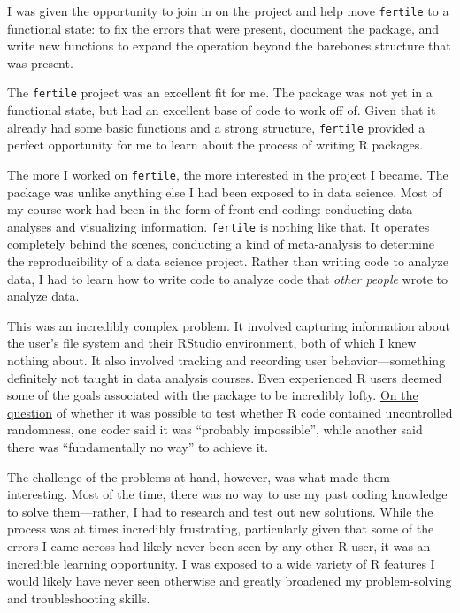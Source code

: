 \documentclass[12pt,twoside]{reedthesis}
\begin{document}
I was given the opportunity to join in on the project and help move \texttt{fertile} to a functional state: to fix the errors that were present, document the package, and write new functions to expand the operation beyond the barebones structure that was present.

The \texttt{fertile} project was an excellent fit for me. The package was not yet in a functional state, but had an excellent base of code to work off of. Given that it already had some basic functions and a strong structure, \texttt{fertile} provided a perfect opportunity for me to learn about the process of writing R packages.

The more I worked on \texttt{fertile}, the more interested in the project I became. The package was unlike anything else I had been exposed to in data science. Most of my course work had been in the form of front-end coding: conducting data analyses and visualizing information. \texttt{fertile} is nothing like that. It operates completely behind the scenes, conducting a kind of meta-analysis to determine the reproducibility of a data science project. Rather than writing code to analyze data, I had to learn how to write code to analyze code that \emph{other people} wrote to analyze data.

This was an incredibly complex problem. It involved capturing information about the user's file system and their RStudio environment, both of which I knew nothing about. It also involved tracking and recording user behavior---something definitely not taught in data analysis courses. Even experienced R users deemed some of the goals associated with the package to be incredibly lofty. \href{https://stackoverflow.com/questions/43638773/comprehensive-way-to-check-for-functions-that-use-the-random-number-generator-in}{On the question} of whether it was possible to test whether R code contained uncontrolled randomness, one coder said it was ``probably impossible'', while another said there was ``fundamentally no way'' to achieve it.

The challenge of the problems at hand, however, was what made them interesting. Most of the time, there was no way to use my past coding knowledge to solve them---rather, I had to research and test out new solutions. While the process was at times incredibly frustrating, particularly given that some of the errors I came across had likely never been seen by any other R user, it was an incredible learning opportunity. I was exposed to a wide variety of R features I would likely have never seen otherwise and greatly broadened my problem-solving and troubleshooting skills.
\end{document}
